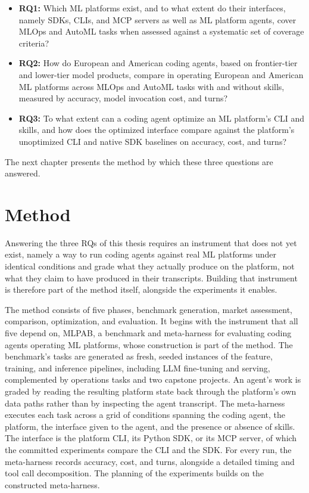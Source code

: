 \documentclass[
english,                 %
bibtex,                  %
]{kththesis}
\numberwithin{listing}{chapter}
\begin{document}
\begin{itemize}
\item \textbf{RQ1:} Which \gls{ML} platforms exist, and to what extent do their interfaces, namely \glspl{SDK}, \glspl{CLI}, and \gls{MCP} servers as well as \gls{ML} platform agents, cover \gls{MLOps} and \gls{AutoML} tasks when assessed against a systematic set of coverage criteria?
\item \textbf{RQ2:} How do European and American coding agents, based on frontier-tier and lower-tier model products, compare in operating European and American \gls{ML} platforms across \gls{MLOps} and \gls{AutoML} tasks with and without skills, measured by accuracy, model invocation cost, and turns?
\item \textbf{RQ3:} To what extent can a coding agent optimize an \gls{ML} platform's \gls{CLI} and skills, and how does the optimized interface compare against the platform's unoptimized \gls{CLI} and native \gls{SDK} baselines on accuracy, cost, and turns?
\end{itemize}

The next chapter presents the method by which these three questions are answered.

\cleardoublepage

\chapter{Method}
\label{ch:method}

\glsresetall

Answering the three \glspl{RQ} of this thesis requires an instrument that does not yet exist, namely a way to run coding agents against real \gls{ML} platforms under identical conditions and grade what they actually produce on the platform, not what they claim to have produced in their transcripts. Building that instrument is therefore part of the method itself, alongside the experiments it enables.

The method consists of five phases, benchmark generation, market assessment, comparison, optimization, and evaluation. It begins with the instrument that all five depend on, \gls{MLPAB}, a benchmark and meta-harness for evaluating coding agents operating \gls{ML} platforms, whose construction is part of the method. The benchmark's tasks are generated as fresh, seeded instances of the feature, training, and inference pipelines, including \gls{LLM} fine-tuning and serving, complemented by operations tasks and two capstone projects. An agent's work is graded by reading the resulting platform state back through the platform's own data paths rather than by inspecting the agent transcript. The meta-harness executes each task across a grid of conditions spanning the coding agent, the platform, the interface given to the agent, and the presence or absence of skills. The interface is the platform \gls{CLI}, its Python \gls{SDK}, or its \gls{MCP} server, of which the committed experiments compare the \gls{CLI} and the \gls{SDK}. For every run, the meta-harness records accuracy, cost, and turns, alongside a detailed timing and tool call decomposition. The planning of the experiments builds on the constructed meta-harness.
\end{document}
